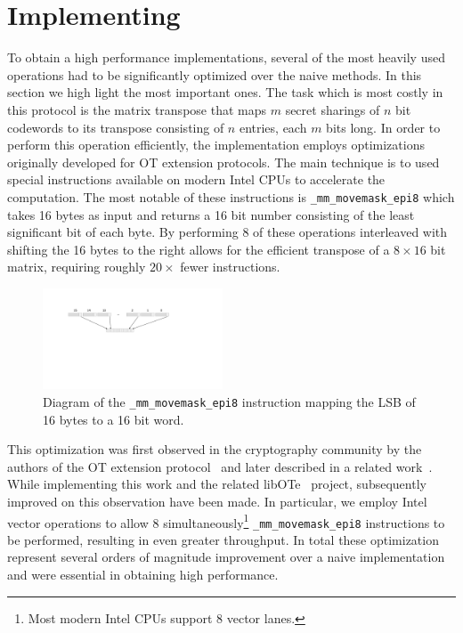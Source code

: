 
\section{Implementing}

To obtain a high performance implementations, several of the most heavily used operations had to be significantly optimized over the naive methods. In this section we high light the most important ones. The task which is most costly in this protocol is the matrix transpose that maps $m$ secret sharings of $n$ bit codewords to its transpose consisting of $n$ entries, each $m$ bits long. In order to perform this operation efficiently, the implementation employs  optimizations originally developed for OT extension protocols. The main technique is to used special instructions available on modern Intel CPUs to accelerate the computation. The most notable of these instructions is \texttt{\_mm\_movemask\_epi8} which takes 16 bytes as input and returns a 16 bit number consisting of the least significant bit of each byte. By performing 8 of these operations interleaved with shifting the 16 bytes to the right allows for the efficient transpose of a $8\times 16$ bit matrix, requiring roughly $20\times$ fewer instructions. 
\begin{figure}[h]
	\centering
\includegraphics[height=3cm,trim={2cm 10.5cm 7cm 3cm},clip]{dgrm}
\caption{Diagram of the \texttt{\_mm\_movemask\_epi8} instruction mapping the LSB of 16 bytes to a 16 bit word.}
\end{figure}

This optimization was first observed in the cryptography community by the authors of the OT extension protocol~\cite{DBLP:conf/crypto/KellerOS15} and later described in a related work~\cite{DBLP:conf/ccs/KellerOS16}. While implementing this work and the related libOTe~\cite{libOTe} project, subsequently improved on this observation have been made. In particular, we employ Intel vector operations to allow 8  simultaneously\footnote{Most modern Intel CPUs support 8 vector lanes.} \texttt{\_mm\_movemask\_epi8} instructions to be performed, resulting in even greater throughput. In total these optimization represent several orders of magnitude improvement over a naive implementation and were essential in obtaining high performance.


